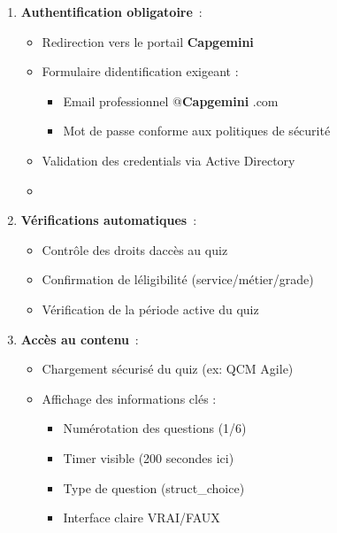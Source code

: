 \documentclass[12pt,a4paper,twoside]{report}
\begin{document}
\begin{enumerate}
\def\labelenumi{\arabic{enumi}.}
\item
  \textbf{Authentification obligatoire}~:

  \begin{itemize}
  \item
    Redirection vers le portail \textbf{Capgemini}
  \item
    Formulaire d\textquotesingle identification exigeant :

    \begin{itemize}
    \item
      Email professionnel @\textbf{Capgemini} .com
    \item
      Mot de passe conforme aux politiques de sécurité
    \end{itemize}
  \item
    Validation des credentials via Active Directory
  \item
  \end{itemize}
\item
  \textbf{Vérifications automatiques}~:

  \begin{itemize}
  \item
    Contrôle des droits d\textquotesingle accès au quiz
  \item
    Confirmation de l\textquotesingle éligibilité (service/métier/grade)
  \item
    Vérification de la période active du quiz
  \end{itemize}
\item
  \textbf{Accès au contenu}~:

  \begin{itemize}
  \item
    Chargement sécurisé du quiz (ex: QCM Agile)
  \item
    Affichage des informations clés :

    \begin{itemize}
    \item
      Numérotation des questions (1/6)
    \item
      Timer visible (200 secondes ici)
    \item
      Type de question (struct\_choice)
    \item
      Interface claire VRAI/FAUX
    \end{itemize}
  \end{itemize}
\end{enumerate}
\end{document}
